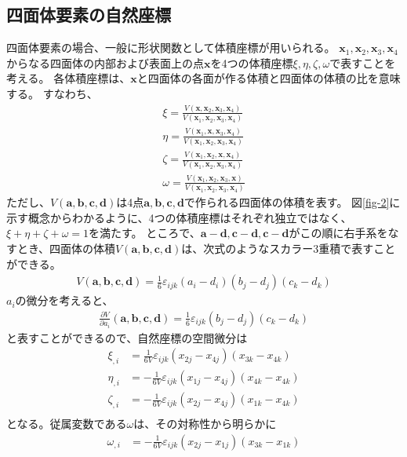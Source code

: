\documentclass{jarticle}
\begin{document}
\subsection{四面体要素の自然座標}
四面体要素の場合、一般に形状関数として体積座標が用いられる。
$\bm{x}_1, \bm{x}_2, \bm{x}_3, \bm{x}_4$からなる四面体の内部および表面上の点$\bm{x}$を4つの体積座標$\xi, \eta, \zeta,\omega$で表すことを考える。
各体積座標は、$\bm{x}$と四面体の各面が作る体積と四面体の体積の比を意味する。
すなわち、
\begin{align}
  \xi = \frac{V(\bm{x}, \bm{x}_2, \bm{x}_3, \bm{x}_4)}{V(\bm{x}_1, \bm{x}_2, \bm{x}_3, \bm{x}_4)}\\
  \eta = \frac{V(\bm{x}_1, \bm{x}, \bm{x}_3, \bm{x}_4)}{V(\bm{x}_1, \bm{x}_2, \bm{x}_3, \bm{x}_4)}\\
  \zeta = \frac{V(\bm{x}_1, \bm{x}_2, \bm{x}, \bm{x}_4)}{V(\bm{x}_1, \bm{x}_2, \bm{x}_3, \bm{x}_4)}\\
  \omega =\frac{V(\bm{x}_1, \bm{x}_2, \bm{x}_3, \bm{x})}{V(\bm{x}_1, \bm{x}_2, \bm{x}_3, \bm{x}_4)}
\end{align}
ただし、$V(\bm{a}, \bm{b}, \bm{c}, \bm{d})$は4点$\bm{a},\bm{b},\bm{c},\bm{d}$で作られる四面体の体積を表す。
図\ref{fig-2}に示す概念からわかるように、4つの体積座標はそれぞれ独立ではなく、$\xi+\eta+\zeta+\omega=1$を満たす。
ところで、$\bm{a}-\bm{d},\bm{c}-\bm{d},\bm{c}-\bm{d}$がこの順に右手系をなすとき、四面体の体積$V(\bm{a}, \bm{b}, \bm{c}, \bm{d})$は、次式のようなスカラー3重積で表すことができる。
\begin{align}
  V(\bm{a}, \bm{b}, \bm{c}, \bm{d}) = \frac{1}{6}\varepsilon_{ijk}(a_i - d_i)(b_j-d_j)(c_k - d_k)
\end{align}
$a_i$の微分を考えると、
\begin{align}
  \frac{\partial V}{\partial a_i}(\bm{a}, \bm{b}, \bm{c}, \bm{d}) = \frac{1}{6}\varepsilon_{ijk}(b_j-d_j)(c_k - d_k)  
\end{align}
と表すことができるので、自然座標の空間微分は
\begin{align}
  \xi_{,i} &= \frac{1}{6V}\varepsilon_{ijk}(x_{2j} - x_{4j})(x_{3k} - x_{4k})\\
  \eta_{,i} &= -\frac{1}{6V}\varepsilon_{ijk}(x_{1j} - x_{4j})(x_{4k} - x_{4k})\\
  \zeta_{,i} &= -\frac{1}{6V}\varepsilon_{ijk}(x_{2j} - x_{4j})(x_{1k} - x_{4k})\\
\end{align}
となる。従属変数である$\omega$は、その対称性から明らかに
\begin{align}
  \omega_{,i} &= -\frac{1}{6V}\varepsilon_{ijk}(x_{2j} - x_{1j})(x_{3k} - x_{1k})
\end{align}
\end{document}
